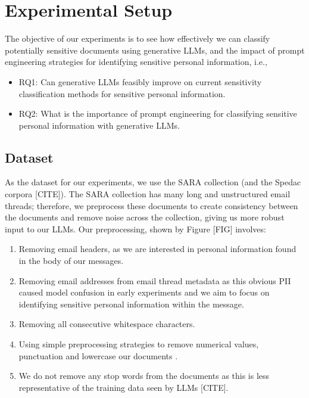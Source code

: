 \section{Experimental Setup}

The objective of our experiments is to see how effectively we can classify potentially sensitive documents using generative LLMs, and the impact of prompt engineering strategies for identifying sensitive personal information, i.e.,
\begin{itemize}
    \item RQ1: Can generative LLMs feasibly improve on current sensitivity classification methods for sensitive personal information.
    \item RQ2: What is the importance of prompt engineering for classifying sensitive personal information with generative LLMs.
\end{itemize}

\subsection{Dataset}
As the dataset for our experiments, we use the SARA collection \cite{mckechnie2024sara} (and the Spedac corpora [CITE]). The SARA collection has many long and unstructured email threads; therefore, we preprocess these documents to create consistency between the documents and remove noise across the collection, giving us more robust input to our LLMs. Our preprocessing, shown by Figure [FIG] involves:
\begin{enumerate}
    \item Removing email headers, as we are interested in personal information found in the body of our messages.
    \item Removing email addresses from email thread metadata as this obvious PII caused model confusion in early experiments and we aim to focus on identifying sensitive personal information within the message.
    \item Removing all consecutive whitespace characters.
    \item Using simple preprocessing strategies to remove numerical values, punctuation and lowercase our documents \cite{rehurek2011gensim}.
    \item We do not remove any stop words from the documents as this is less representative of the training data seen by LLMs [CITE].
\end{enumerate}

